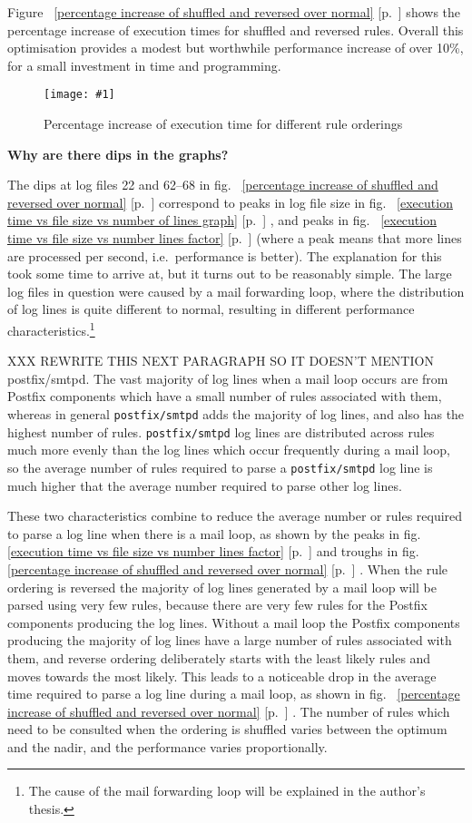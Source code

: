 \documentclass[draft]{svmult}
\newcommand{\showgraph}[3]{%
    \begin{figure}[hbt!]
        \caption{#2}\label{#3}
        \texttt{[image: \#1]}
    \end{figure}
}
\newcommand{\refwithpage}[1]{%
    \empty{}\ref{#1} [p.~\pageref{#1}]%
}
\newcommand{\daemon}[1]{%
    \texttt{postfix/#1}%
}
\begin{document}
Figure~\refwithpage{percentage increase of shuffled and reversed over
normal} shows the percentage increase of execution times for shuffled and
reversed rules.  Overall this optimisation provides a modest but worthwhile
performance increase of over 10\%, for a small investment in time and
programming.
\showgraph{build/plot-normal-shuffle-reverse-factor}{Percentage increase of
execution time for different rule orderings}{percentage increase of
shuffled and reversed over normal}

\noindent\textbf{Why are there dips in the graphs?}

\label{Why are there dips in the graphs?}

The dips at log files 22 and 62--68 in fig.~\refwithpage{percentage
increase of shuffled and reversed over normal} correspond to peaks in log
file size in fig.~\refwithpage{execution time vs file size vs number of
lines graph}, and peaks in fig.~\refwithpage{execution time vs file size vs
number lines factor} (where a peak means that more lines are processed per
second, i.e.\ performance is better).  The explanation for this took some
time to arrive at, but it turns out to be reasonably simple.  The large log
files in question were caused by a mail forwarding loop, where the
distribution of log lines is quite different to normal, resulting in
different performance characteristics.\footnote{The cause of the mail
forwarding loop will be explained in the author's thesis.}

XXX REWRITE THIS NEXT PARAGRAPH SO IT DOESN'T MENTION postfix/smtpd.  The
vast majority of log lines when a mail loop occurs are from Postfix
components which have a small number of rules associated with them, whereas
in general \daemon{smtpd} adds the majority of log lines, and also has the
highest number of rules.  \daemon{smtpd} log lines are distributed across
rules much more evenly than the log lines which occur frequently during a
mail loop, so the average number of rules required to parse a
\daemon{smtpd} log line is much higher that the average number required to
parse other log lines.

These two characteristics combine to reduce the average number or rules
required to parse a log line when there is a mail loop, as shown by the
peaks in fig.~\refwithpage{execution time vs file size vs number lines
factor} and troughs in fig.~\refwithpage{percentage increase of shuffled
and reversed over normal}.  When the rule ordering is reversed the majority
of log lines generated by a mail loop will be parsed using very few rules,
because there are very few rules for the Postfix components producing the
log lines.  Without a mail loop the Postfix components producing the
majority of log lines have a large number of rules associated with them,
and reverse ordering deliberately starts with the least likely rules and
moves towards the most likely.  This leads to a noticeable drop in the
average time required to parse a log line during a mail loop, as shown in
fig.~\refwithpage{percentage increase of shuffled and reversed over
normal}.  The number of rules which need to be consulted when the ordering
is shuffled varies between the optimum and the nadir, and the performance
varies proportionally.
\end{document}
